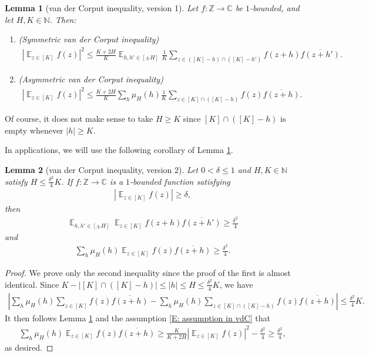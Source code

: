 \documentclass[11pt]{amsart}
\newtheorem{lemma}{Lemma}[section]
\theoremstyle{definition}
\DeclareMathOperator*{\E}{\mathbb{E}}
\newcommand{\C}{{\mathbb C}}
\newcommand{\N}{{\mathbb N}}
\newcommand{\Z}{{\mathbb Z}}
\newcommand{\abs}[1]{\mathopen{}\left| #1\mathclose{}\right|}
\begin{document}
\begin{lemma}[van der Corput inequality, version 1]\label{L: vdC 0}
    Let $f:\Z\to\C$ be $1$-bounded, and let $H, K\in\N$. Then: 
    \begin{enumerate}
        \item (Symmetric van der Corput inequality)
    \begin{align*}
        \abs{\E_{z\in[K]}f(z)}^2 \leq \frac{K+2H}{K}\E_{h, h'\in[\pm H]}\frac{1}{K}\sum_{z\in([K]-h)\cap([K]-h')}f(z + h)\overline{f(z+h')}.
    \end{align*}
        \item (Asymmetric van der Corput inequality)
            \begin{align*}
        \abs{\E_{z\in[K]}f(z)}^2 \leq \frac{K+2H}{K}\sum_{h}\mu_H(h)\frac{1}{K}\sum_{z\in[K]\cap([K]-h)}f(z)\overline{f(z+h)}.
    \end{align*}
    \end{enumerate}
\end{lemma}
    Of course, it does not make sense to take $H\geq K$ since $[K]\cap([K]-h)$ is empty whenever $|h|\geq K$.
    
In applications, we will use the following corollary of Lemma \ref{L: vdC 0}.
\begin{lemma}[van der Corput inequality, version 2]\label{L: vdC}
    Let $0<\delta\leq 1$ and $H, K\in\N$ satisfy $H\leq \frac{\delta^2}{4}K$. If $f:\Z\to\C$ is a $1$-bounded function satisfying 
    \begin{align}\label{E: assumption in vdC}
        \abs{\E_{z\in[K]}f(z)}\geq \delta,
    \end{align}
    then
    \begin{align*}
        \E_{h,h'\in[\pm H]}\E_{z\in[K]}f(z+h)\overline{f(z+h')}\geq \frac{\delta^2}{4}
    \end{align*}
    and
    \begin{align*}
        {\sum_{h}\mu_H(h)\E_{z\in[K]}f(z)\overline{f(z+h)}}\geq \frac{\delta^2}{4}.
    \end{align*}
\end{lemma}
\begin{proof}
We prove only the second inequality since the proof of the first is almost identical.
    Since $K - |[K]\cap([K]-h)|\leq |h|\leq H\leq \frac{\delta^2}{4}K$, we have
    \begin{align*}
    \abs{\sum_{h}\mu_H(h)\sum_{z\in[K]}f(z)\overline{f(z+h)} - \sum_{h}\mu_H(h)\sum_{z\in[K]\cap([K]-h)}f(z)\overline{f(z+h)}}\leq \frac{\delta^2}{4}K. 
    \end{align*}
    It then follows Lemma \ref{L: vdC 0} and the assumption \eqref{E: assumption in vdC} that
    \begin{align*}
        {\sum_{h}\mu_H(h)\E_{z\in[K]}f(z)\overline{f(z+h)}}\geq \frac{K}{K+2H}\abs{\E_{z\in[K]}f(z)}^2 - \frac{\delta^2}{4}\geq \frac{\delta^2}{4},
    \end{align*}
    as desired.
\end{proof}
\end{document}

